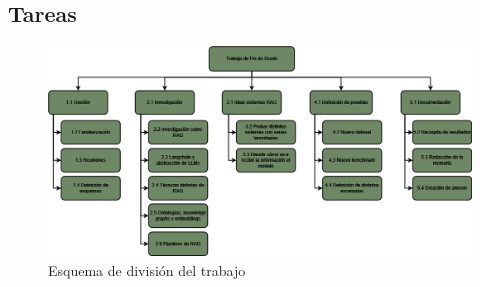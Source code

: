 \subsection{Tareas}
\begin{figure}[!h]
    \centering
    \includegraphics[width=1\textwidth]{images/tfg_edt.png}
    \caption{Esquema de división del trabajo}
    \label{fig:edt}
\end{figure}